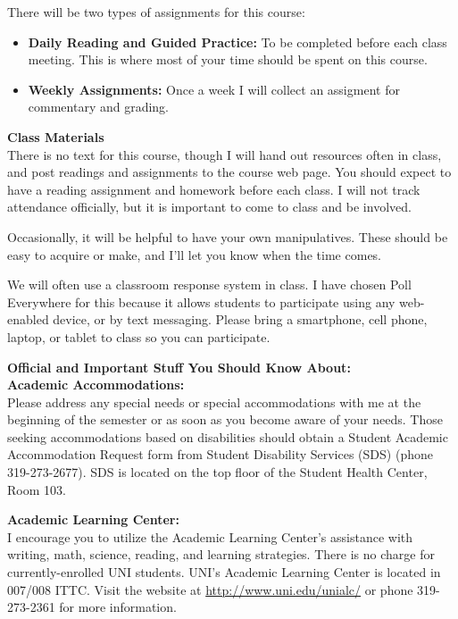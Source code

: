 \documentclass[12pt]{amsart}
\begin{document}
There will be two types of assignments for this course:
\begin{itemize}
\item \textbf{Daily Reading and Guided Practice:} To be completed before each class meeting. This is where most of your time should be spent on this course.
\item \textbf{Weekly Assignments:} Once a week I will collect an assigment for commentary and grading.\\[.1in]
\end{itemize}

\noindent
\textbf{Class Materials}\\
There is no text for this course, though I will hand out resources often in class, and post readings and assignments to the course web page. You should expect to have a reading assignment and homework before each class. I will not track attendance officially, but it is important to come to class and be involved.

Occasionally, it will be helpful to have your own manipulatives. These should be easy to acquire or make, and I’ll let you know when the time comes.

We will often use a classroom response system in class. I have chosen Poll Everywhere for this because it allows students to participate using any web-enabled device, or by text messaging. Please bring a smartphone, cell phone, laptop, or tablet to class so you can participate.\\

\clearpage

\noindent
\textbf{Official and Important Stuff You Should Know About:}\\

\noindent
\textbf{Academic Accommodations:}\\
Please address any special needs or special accommodations with me at the beginning of the semester or as soon as you become aware of your needs. Those seeking accommodations based on disabilities should obtain a Student Academic Accommodation Request form from Student Disability Services (SDS) (phone 319-273-2677). SDS is located on the top floor of the Student Health Center, Room 103.

\noindent
\textbf{Academic Learning Center:}\\
I encourage you to utilize the Academic Learning Center’s assistance with writing, math, science, reading, and learning strategies. There is no charge for currently-enrolled UNI students. UNI’s Academic Learning Center is located in 007/008 ITTC. Visit the website at \url{http://www.uni.edu/unialc/} or phone 319-273-2361 for more information.
\end{document}
